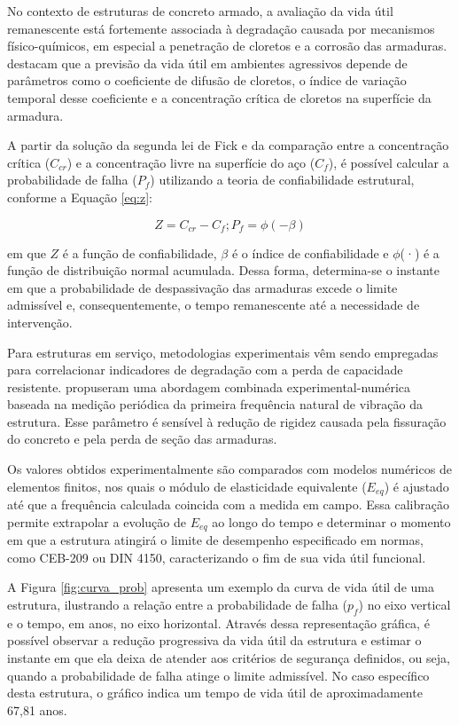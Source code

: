 No contexto de estruturas de concreto armado, a avaliação da vida útil remanescente está fortemente associada à degradação causada por mecanismos físico-químicos, em especial a penetração de cloretos e a corrosão das armaduras. \textcite{feng_prediction_2025} destacam que a previsão da vida útil em ambientes agressivos depende de parâmetros como o coeficiente de difusão de cloretos, o índice de variação temporal desse coeficiente e a concentração crítica de cloretos na superfície da armadura.

A partir da solução da segunda lei de Fick e da comparação entre a concentração crítica ($C_{cr}$) e a concentração livre na superfície do aço ($C_f$), é possível calcular a probabilidade de falha ($P_f$) utilizando a teoria de confiabilidade estrutural, conforme a Equação \eqref{eq:z}:

\begin{equation}\label{eq:z}
Z = C_{cr} - C_f ; P_f = \phi(-\beta)
\end{equation}

em que $Z$ é a função de confiabilidade, $\beta$ é o índice de confiabilidade e $\phi$(·) é a função de distribuição normal acumulada. Dessa forma, determina-se o instante em que a probabilidade de despassivação das armaduras excede o limite admissível e, consequentemente, o tempo remanescente até a necessidade de intervenção.

Para estruturas em serviço, metodologias experimentais vêm sendo empregadas para correlacionar indicadores de degradação com a perda de capacidade resistente. \textcite{ortega_assessment_2016} propuseram uma abordagem combinada experimental-numérica baseada na medição periódica da primeira frequência natural de vibração da estrutura. Esse parâmetro é sensível à redução de rigidez causada pela fissuração do concreto e pela perda de seção das armaduras.

Os valores obtidos experimentalmente são comparados com modelos numéricos de elementos finitos, nos quais o módulo de elasticidade equivalente ($E_{eq}$) é ajustado até que a frequência calculada coincida com a medida em campo. Essa calibração permite extrapolar a evolução de $E_{eq}$ ao longo do tempo e determinar o momento em que a estrutura atingirá o limite de desempenho especificado em normas, como CEB-209 ou DIN 4150, caracterizando o fim de sua vida útil funcional. 

A Figura \ref{fig:curva_prob} apresenta um exemplo da curva de vida útil de uma estrutura, ilustrando a relação entre a probabilidade de falha ($p_f$) no eixo vertical e o tempo, em anos, no eixo horizontal. Através dessa representação gráfica, é possível observar a redução progressiva da vida útil da estrutura e estimar o instante em que ela deixa de atender aos critérios de segurança definidos, ou seja, quando a probabilidade de falha atinge o limite admissível. No caso específico desta estrutura, o gráfico indica um tempo de vida útil de aproximadamente 67,81 anos.

